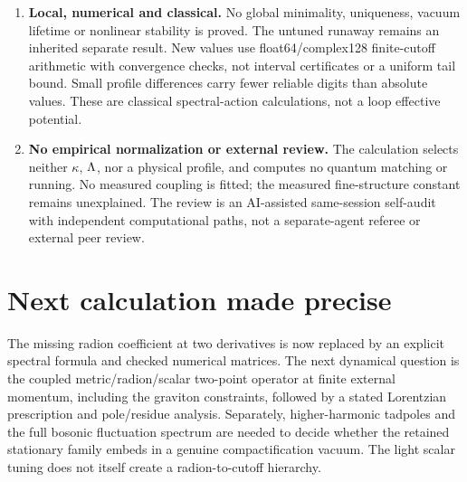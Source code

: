 \begin{enumerate}
 \item \textbf{Local, numerical and classical.} No global minimality, uniqueness, vacuum lifetime or nonlinear stability is proved. The untuned runaway remains an inherited separate result. New values use float64/complex128 finite-cutoff arithmetic with convergence checks, not interval certificates or a uniform tail bound. Small profile differences carry fewer reliable digits than absolute values. These are classical spectral-action calculations, not a loop effective potential.
 \item \textbf{No empirical normalization or external review.} The calculation selects neither $\kappa$, $\Lambda$, nor a physical profile, and computes no quantum matching or running. No measured coupling is fitted; the measured fine-structure constant remains unexplained. The review is an AI-assisted same-session self-audit with independent computational paths, not a separate-agent referee or external peer review.
\end{enumerate}

\section{Next calculation made precise}

The missing radion coefficient at two derivatives is now replaced by an explicit spectral formula and checked numerical matrices. The next dynamical question is the coupled metric/radion/scalar two-point operator at finite external momentum, including the graviton constraints, followed by a stated Lorentzian prescription and pole/residue analysis. Separately, higher-harmonic tadpoles and the full bosonic fluctuation spectrum are needed to decide whether the retained stationary family embeds in a genuine compactification vacuum. The light scalar tuning does not itself create a radion-to-cutoff hierarchy.

